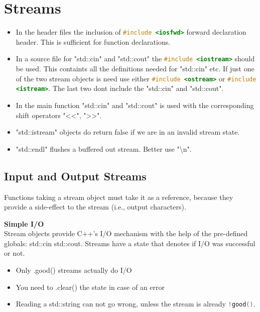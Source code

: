 \section{Streams}
\begin{itemize}
  \itemsep -0.5em 
  \item In the header files the inclusion of \lstinline[language=C++]{#include <iosfwd>} forward declaration header. This is sufficient for function declarations.
  \item In a source file for "std::cin" and "std::cout" the \lstinline[language=C++]{#include <iostream>} should be used. This containts all the definitions needed for "std::cin" etc. If just one of the two stream objects is need use either \lstinline[language=C++]{#include <ostream>} or \lstinline[language=C++]{#include <istream>}. The last two dont include the "std::cin" and "std::cout".
  \item In the main function "std::cin" and "std::cout" is used with the corresponding shift operators "<<", ">>".
  \item "std::istream" objects do return false if we are in an invalid stream state.
  \item "std::endl" flushes a buffered out stream. Better use "\textbackslash n". 
\end{itemize}

\subsection{Input and Output Streams} 
Functions taking a stream object must take it as a reference, because they provide a side-effect to the stream (i.e., output characters).

\textbf{Simple I/O} \\
Stream objects provide C++'s I/O mechanism with the help of the pre-defined globals: std::cin std::cout. Streams have a state that denotes if I/O was successful or not.
\begin{itemize}
  \itemsep -0.5em 
  \item Only .good() streams actually do I/O
  \item You need to .clear() the state in case of an error
  \item Reading a std::string can not go wrong, unless the stream is already \lstinline[language=C++]{!good()}.
\end{itemize}

